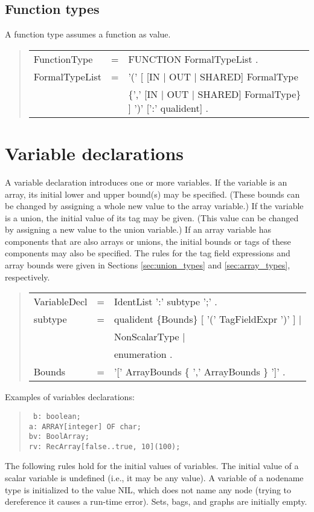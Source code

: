 \documentclass[10pt]{article}
\newenvironment{grammar}
{\begin{quote} \begin{tabular}{p{3.8cm} l l}}
{\end{tabular}\end{quote}}
\begin{document}
\subsection{Function types}

A function type assumes a function as value.
\begin{grammar}
FunctionType & = & FUNCTION FormalTypeList . \\
FormalTypeList & = & '(' [ [IN $|$ OUT $|$ SHARED] FormalType \\
& & \{',' [IN $|$ OUT $|$ SHARED] FormalType\} ] ')' [':' qualident] .
\end{grammar}
\section{Variable declarations}\label{sec:variables}

A variable declaration introduces one or more variables.
If the variable is an array,
its initial lower and upper bound(s) may be specified.
(These bounds can be changed by assigning a whole new value to the
array variable.)
If the variable is a union, the initial value of its tag may be given.
(This value can be changed by assigning a new value to the
union variable.)
If an array variable has components that are
also arrays or unions, the initial bounds or tags of these components may also
be specified.
The rules for the tag field expressions and array bounds
were given in Sections \ref{sec:union_types} and \ref{sec:array_types}, respectively.
\begin{grammar}
VariableDecl & = & IdentList ':' subtype ';' . \\
subtype & = & qualident \{Bounds\} [ '(' TagFieldExpr ')' ] $|$ \\
& & NonScalarType $|$ \\
& & enumeration . \\
Bounds & = & '[' ArrayBounds \{ ',' ArrayBounds \} ']' .
\end{grammar}
Examples of variables declarations:
\begin{quote}\tt
b:~boolean; \\
a:~ARRAY[integer] OF char; \\
bv:~BoolArray; \\
rv:~RecArray[false..true, 10](100);
\end{quote}
The following rules hold for the initial values of variables.
The initial value of a scalar variable is undefined (i.e., it may be any value).
A variable of a nodename type is initialized to the value NIL,
which does not name any node (trying to dereference it causes a run-time error).
Sets, bags, and graphs are initially empty.
\end{document}

